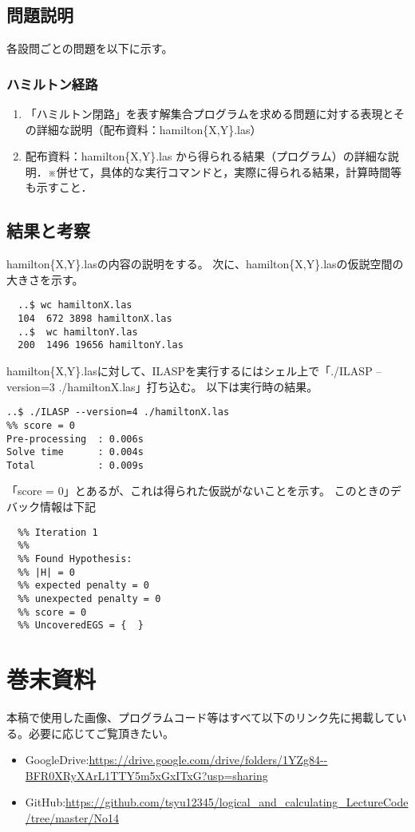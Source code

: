 \documentclass[dvipdfmx]{jsarticle}
\begin{document}
\subsection{問題説明}
各設問ごとの問題を以下に示す。
\subsubsection{ハミルトン経路}
\begin{enumerate}
  \item 「ハミルトン閉路」を表す解集合プログラムを求める問題に対する表現とその詳細な説明（配布資料：hamilton\{X,Y\}.las）
  \item 配布資料：hamilton\{X,Y\}.las から得られる結果（プログラム）の詳細な説明．※併せて，具体的な実行コマンドと，実際に得られる結果，計算時間等も示すこと．

\end{enumerate}
\subsection{結果と考察}
hamilton\{X,Y\}.lasの内容の説明をする。
次に、hamilton\{X,Y\}.lasの仮説空間の大きさを示す。
\begin{verbatim}
  ..$ wc hamiltonX.las
  104  672 3898 hamiltonX.las
  ..$  wc hamiltonY.las
  200  1496 19656 hamiltonY.las
\end{verbatim}
hamilton\{X,Y\}.lasに対して、ILASPを実行するにはシェル上で「./ILASP --version=3 ./hamiltonX.las」打ち込む。
以下は実行時の結果。
\begin{verbatim}
..$ ./ILASP --version=4 ./hamiltonX.las
%% score = 0
Pre-processing  : 0.006s
Solve time      : 0.004s
Total           : 0.009s
\end{verbatim}
「score = 0」とあるが、これは得られた仮説がないことを示す。
このときのデバック情報は下記
\begin{verbatim}
  %% Iteration 1
  %%
  %% Found Hypothesis:
  %% |H| = 0
  %% expected penalty = 0
  %% unexpected penalty = 0
  %% score = 0
  %% UncoveredEGS = {  }
\end{verbatim}









\section{巻末資料}
  本稿で使用した画像、プログラムコード等はすべて以下のリンク先に掲載している。必要に応じてご覧頂きたい。
  \begin{itemize}
    \item GoogleDrive:\url{https://drive.google.com/drive/folders/1YZg84--BFR0XRyXArL1TTY5m5xGxITxG?usp=sharing}
    \item GitHub:\url{https://github.com/tsyu12345/logical_and_calculating_LectureCode/tree/master/No14}
  \end{itemize}
\end{document}
